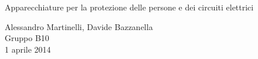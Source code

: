 \begin{center}

     	{\huge Apparecchiature per la protezione delle persone e dei circuiti elettrici}

     	\vspace{0.2cm}
	\vspace{0.3cm}

      	{\large Alessandro Martinelli, Davide Bazzanella} \\
		{ Gruppo B10} \\
	
	\vspace{0.1cm}
      	{ 1 aprile 2014}

\end{center}
